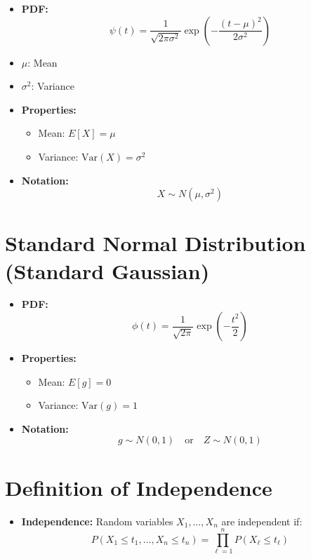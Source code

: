 \documentclass{article}
\begin{document}
\begin{itemize}
    \item \textbf{PDF:}
    \[
    \psi(t) = \frac{1}{\sqrt{2\pi\sigma^2}} \exp\left(-\frac{(t - \mu)^2}{2\sigma^2}\right)
    \]

    \item \(\mu\): Mean
    \item \(\sigma^2\): Variance

    \item \textbf{Properties:}
    \begin{itemize}
        \item Mean: \(E[X] = \mu\)
        \item Variance: \(\text{Var}(X) = \sigma^2\)
    \end{itemize}

    \item \textbf{Notation:}
    \[
    X \sim N(\mu, \sigma^2)
    \]
\end{itemize}

\section*{Standard Normal Distribution (Standard Gaussian)}

\begin{itemize}
    \item \textbf{PDF:}
    \[
    \phi(t) = \frac{1}{\sqrt{2\pi}} \exp\left(-\frac{t^2}{2}\right)
    \]

    \item \textbf{Properties:}
    \begin{itemize}
        \item Mean: \(E[g] = 0\)
        \item Variance: \(\text{Var}(g) = 1\)
    \end{itemize}

    \item \textbf{Notation:}
    \[
    g \sim N(0, 1) \quad \text{or} \quad Z \sim N(0, 1)
    \]
\end{itemize}











\section*{Definition of Independence}
\begin{itemize}
    \item \textbf{Independence:} Random variables $X_1, \ldots, X_n$ are independent if:
    \[
    P(X_1 \leq t_1, \ldots, X_n \leq t_n) = \prod_{\ell=1}^{n} P(X_\ell \leq t_\ell)
    \]
\end{itemize}
\end{document}
